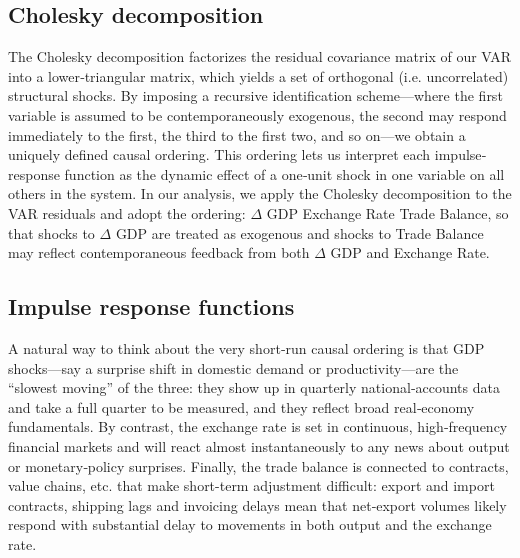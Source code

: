 \documentclass[
]{article}
\begin{document}
\subsection{Cholesky decomposition}

The Cholesky decomposition factorizes the residual covariance matrix of our 
VAR into a lower‐triangular matrix, which yields a set of orthogonal
(i.e. uncorrelated) structural shocks. By imposing a recursive identification
scheme—where the first variable is assumed to be contemporaneously exogenous, 
the second may respond immediately to the first, the third to the first two,
and so on—we obtain a uniquely defined causal ordering. This ordering lets us 
interpret each impulse‐response function as the dynamic effect of a one‐unit 
shock in one variable on all others in the system. In our analysis, we apply 
the Cholesky decomposition to the VAR residuals and adopt the 
ordering: $\Delta$ GDP \textrightarrow Exchange Rate \textrightarrow Trade Balance, 
so that shocks to  $\Delta$ GDP are treated as exogenous and shocks to Trade Balance 
may reflect contemporaneous feedback from both $\Delta$ GDP and Exchange Rate.

\subsection{Impulse response functions}

A natural way to think about the very short‐run causal ordering is that GDP 
shocks—say a surprise shift in domestic demand or productivity—are the 
“slowest moving” of the three: they show up in quarterly national‐accounts 
data and take a full quarter to be measured, and they reflect broad real‐economy
fundamentals. By contrast, the exchange rate is set in continuous, 
high‐frequency financial markets and will react almost instantaneously to 
any news about output or monetary‐policy surprises. Finally, the trade balance 
is connected to contracts, value chains, etc. that make short-term adjustment 
difficult: export and import contracts, shipping lags and invoicing delays mean
that net‐export volumes likely respond with substantial delay to movements
in both output and the exchange rate.
\end{document}
